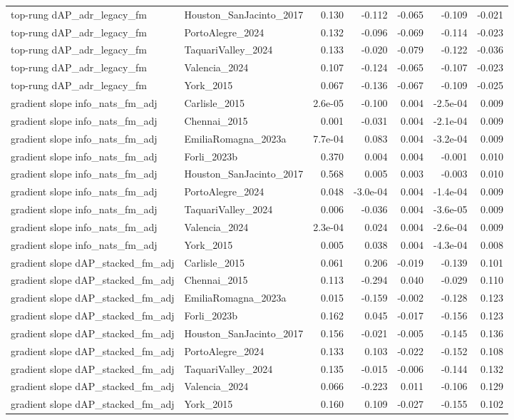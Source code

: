 \begin{tabular}{llrrrrr}
top-rung dAP\_adr\_legacy\_fm & Houston\_SanJacinto\_2017 & 0.130 & -0.112 & -0.065 & -0.109 & -0.021 \\
top-rung dAP\_adr\_legacy\_fm & PortoAlegre\_2024 & 0.132 & -0.096 & -0.069 & -0.114 & -0.023 \\
top-rung dAP\_adr\_legacy\_fm & TaquariValley\_2024 & 0.133 & -0.020 & -0.079 & -0.122 & -0.036 \\
top-rung dAP\_adr\_legacy\_fm & Valencia\_2024 & 0.107 & -0.124 & -0.065 & -0.107 & -0.023 \\
top-rung dAP\_adr\_legacy\_fm & York\_2015 & 0.067 & -0.136 & -0.067 & -0.109 & -0.025 \\
gradient slope info\_nats\_fm\_adj & Carlisle\_2015 & 2.6e-05 & -0.100 & 0.004 & -2.5e-04 & 0.009 \\
gradient slope info\_nats\_fm\_adj & Chennai\_2015 & 0.001 & -0.031 & 0.004 & -2.1e-04 & 0.009 \\
gradient slope info\_nats\_fm\_adj & EmiliaRomagna\_2023a & 7.7e-04 & 0.083 & 0.004 & -3.2e-04 & 0.009 \\
gradient slope info\_nats\_fm\_adj & Forli\_2023b & 0.370 & 0.004 & 0.004 & -0.001 & 0.010 \\
gradient slope info\_nats\_fm\_adj & Houston\_SanJacinto\_2017 & 0.568 & 0.005 & 0.003 & -0.003 & 0.010 \\
gradient slope info\_nats\_fm\_adj & PortoAlegre\_2024 & 0.048 & -3.0e-04 & 0.004 & -1.4e-04 & 0.009 \\
gradient slope info\_nats\_fm\_adj & TaquariValley\_2024 & 0.006 & -0.036 & 0.004 & -3.6e-05 & 0.009 \\
gradient slope info\_nats\_fm\_adj & Valencia\_2024 & 2.3e-04 & 0.024 & 0.004 & -2.6e-04 & 0.009 \\
gradient slope info\_nats\_fm\_adj & York\_2015 & 0.005 & 0.038 & 0.004 & -4.3e-04 & 0.008 \\
gradient slope dAP\_stacked\_fm\_adj & Carlisle\_2015 & 0.061 & 0.206 & -0.019 & -0.139 & 0.101 \\
gradient slope dAP\_stacked\_fm\_adj & Chennai\_2015 & 0.113 & -0.294 & 0.040 & -0.029 & 0.110 \\
gradient slope dAP\_stacked\_fm\_adj & EmiliaRomagna\_2023a & 0.015 & -0.159 & -0.002 & -0.128 & 0.123 \\
gradient slope dAP\_stacked\_fm\_adj & Forli\_2023b & 0.162 & 0.045 & -0.017 & -0.156 & 0.123 \\
gradient slope dAP\_stacked\_fm\_adj & Houston\_SanJacinto\_2017 & 0.156 & -0.021 & -0.005 & -0.145 & 0.136 \\
gradient slope dAP\_stacked\_fm\_adj & PortoAlegre\_2024 & 0.133 & 0.103 & -0.022 & -0.152 & 0.108 \\
gradient slope dAP\_stacked\_fm\_adj & TaquariValley\_2024 & 0.135 & -0.015 & -0.006 & -0.144 & 0.132 \\
gradient slope dAP\_stacked\_fm\_adj & Valencia\_2024 & 0.066 & -0.223 & 0.011 & -0.106 & 0.129 \\
gradient slope dAP\_stacked\_fm\_adj & York\_2015 & 0.160 & 0.109 & -0.027 & -0.155 & 0.102 \\
\bottomrule
\end{tabular}
